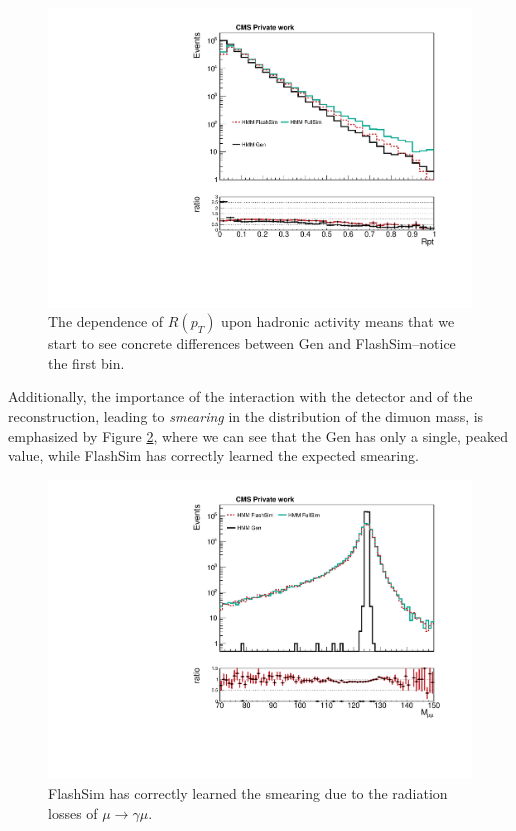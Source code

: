 \begin{figure}
    \centering
    \includegraphics[width=\linewidth]{gfx/ch6/gen_vs_flash_Rpt___PreSel_log.pdf}
    \caption[Gen vs FlashSim for $R(p_T)$]{The dependence of $R(p_T)$ upon hadronic activity means that we start to see concrete differences between Gen and FlashSim--notice the first bin.}
    \label{fig:rptgen}
   \end{figure}
   
Additionally, the importance of the interaction with the detector and of the reconstruction, leading to \emph{smearing} in the distribution of the dimuon mass, is emphasized by Figure \ref{fig:higggen}, where we can see that the Gen has only a single, peaked value, while FlashSim has correctly learned the expected smearing.

\begin{figure}
    \centering
    \includegraphics[width=\linewidth]{gfx/ch6/gen_vs_flash_Higgs_m___PreSel_log.pdf}
    \caption[Gen vs FlashSim for $M_{\mu\mu}$]{FlashSim has correctly learned the smearing due to the radiation losses of $\mu \rightarrow \gamma \mu$.}
    \label{fig:higggen}
   \end{figure}
   
